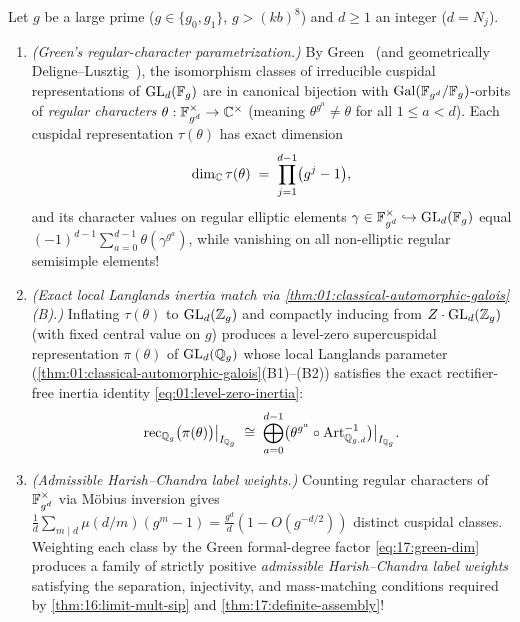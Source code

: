 \begin{theorem}
\label{thm:17:green-weights}
Let $g$ be a large prime ($g \in \{g_0, g_1\}$, $g > (k b)^8$) and $d \ge 1$ an integer ($d = N_j$).
\begin{enumerate}[label=\textup{(\roman*)}]
\item \emph{(Green's regular-character parametrization.)} By Green~\cite[Theorem~14]{Green1955} (and geometrically Deligne--Lusztig~\cite{DeligneLusztig1976}), the isomorphism classes of irreducible cuspidal representations of $\mathrm{GL}_d(\mathbb{F}_g)$ are in canonical bijection with $\mathrm{Gal}(\mathbb{F}_{g^d}/\mathbb{F}_g)$-orbits of \emph{regular characters} $\theta : \mathbb{F}_{g^d}^\times \to \mathbb{C}^\times$ (meaning $\theta^{g^a} \neq \theta$ for all $1 \le a < d$). Each cuspidal representation $\tau(\theta)$ has exact dimension
  \begin{equation}
  \label{eq:17:green-dim}
    \dim_{\mathbb{C}} \tau(\theta) \;=\; \prod_{j = 1}^{d - 1} \bigl(g^j - 1\bigr),
  \end{equation}
  and its character values on regular elliptic elements $\gamma \in \mathbb{F}_{g^d}^\times \hookrightarrow \mathrm{GL}_d(\mathbb{F}_g)$ equal $(-1)^{d-1}\sum_{a=0}^{d-1} \theta(\gamma^{g^a})$, while vanishing on all non-elliptic regular semisimple elements!
\item \emph{(Exact local Langlands inertia match via \cref{thm:01:classical-automorphic-galois}(B).)} Inflating $\tau(\theta)$ to $\mathrm{GL}_d(\mathbb{Z}_g)$ and compactly inducing from $Z \cdot \mathrm{GL}_d(\mathbb{Z}_g)$ (with fixed central value on $g$) produces a level-zero supercuspidal representation $\pi(\theta)$ of $\mathrm{GL}_d(\mathbb{Q}_g)$ whose local Langlands parameter (\cref{thm:01:classical-automorphic-galois}(B1)--(B2)) satisfies the exact rectifier-free inertia identity \eqref{eq:01:level-zero-inertia}:
  \[
    \mathrm{rec}_{\mathbb{Q}_g}\bigl(\pi(\theta)\bigr)\big|_{I_{\mathbb{Q}_g}}
    \;\cong\; \bigoplus_{a = 0}^{d - 1} \bigl(\theta^{g^a} \circ \mathrm{Art}_{\mathbb{Q}_{g, d}}^{-1}\bigr)\big|_{I_{\mathbb{Q}_g}}.
  \]
\item \emph{(Admissible Harish--Chandra label weights.)} Counting regular characters of $\mathbb{F}_{g^d}^\times$ via M\"obius inversion gives $\frac{1}{d}\sum_{m \mid d} \mu(d/m)(g^m - 1) = \frac{g^d}{d}(1 - O(g^{-d/2}))$ distinct cuspidal classes. Weighting each class by the Green formal-degree factor \eqref{eq:17:green-dim} produces a family of strictly positive \emph{admissible Harish--Chandra label weights} satisfying the separation, injectivity, and mass-matching conditions required by \cref{thm:16:limit-mult-sip} and \cref{thm:17:definite-assembly}!
\end{enumerate}
\end{theorem}
